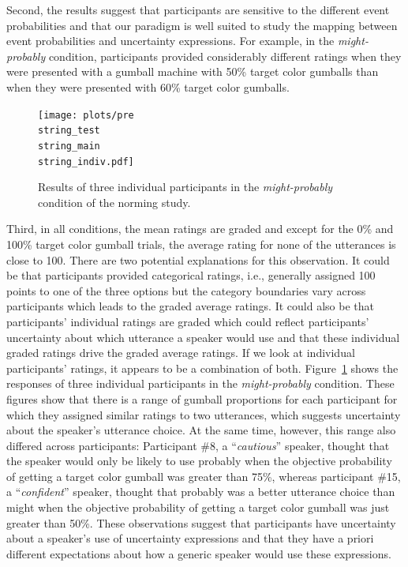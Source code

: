 \documentclass[lucida,biblatex]{sp} %
\begin{document}
Second, the results suggest that participants are sensitive to the different event probabilities and that our paradigm is well suited to study 
the mapping between event probabilities and uncertainty expressions. For example, in the \textit{might-probably} condition, participants
provided considerably different ratings when they were presented with a gumball machine with 50\% target color gumballs than when they
were presented with 60\% target color gumballs.

\begin{figure}
\texttt{[image: plots/pre\\string\_test\\string\_main\\string\_indiv.pdf]}
\caption{Results of three individual participants in the \emph{might-probably} condition of the norming study. \label{fig:norming-results-indiv}}
\end{figure}


Third, in all conditions, the mean ratings are graded and except for the 0\% and 100\% target color gumball trials, the average rating for none of the
utterances is close to 100. There are two potential explanations for this observation. It could be that participants provided categorical ratings, i.e.,
generally assigned 100 points to one of the three options but the category boundaries vary across participants which leads to the graded average ratings.
It could also be that participants' individual ratings are graded which could reflect participants' uncertainty about which utterance a speaker would use 
and that these individual graded ratings drive the  graded average ratings. If we look at individual participants' ratings, it appears to be a combination of both.
Figure~\ref{fig:norming-results-indiv} shows the responses of three individual participants in the \emph{might-probably} condition. These figures show that there 
is a range of gumball proportions for each participant for which they assigned similar ratings to two utterances, which suggests uncertainty about the speaker's 
utterance choice. At the same time, however, this range also differed across participants: Participant \#8, a ``\textit{cautious}'' speaker, thought that the speaker would only be likely to use {\sc probably} 
when the objective probability of getting a target color gumball was greater than 75\%, whereas participant \#15, a ``\textit{confident}'' speaker, thought that  {\sc probably} was a better utterance choice than {\sc might} 
when the objective probability of getting a target color gumball was just greater than 50\%. These observations suggest that participants have uncertainty about a 
speaker's use of uncertainty expressions and that they have a priori different expectations about how a generic speaker would use these expressions.
\end{document}

